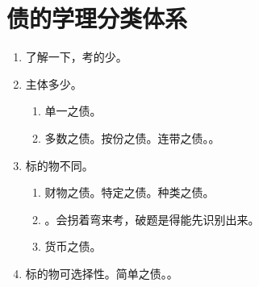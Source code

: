 \section{债的学理分类体系}
\begin{enumerate}
  \item 了解一下，考的少。
  \item 主体多少。
        \begin{enumerate}
          \item 单一之债。
          \item 多数之债。\yi 按份之债。\er 连带之债。。
        \end{enumerate}
  \item 标的物不同。
        \begin{enumerate}
          \item 财物之债。\yi 特定之债。\er 种类之债。
          \item {}。会拐着弯来考，破题是得能先识别出来。
          \item 货币之债。
        \end{enumerate}
  \item 标的物可选择性。\yi 简单之债。\er {}。
\end{enumerate}
